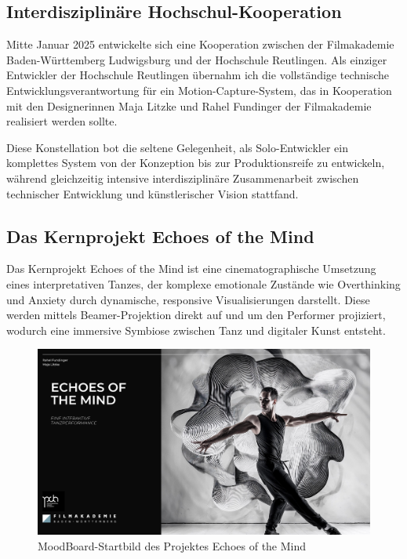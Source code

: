 
\subsection{Interdisziplinäre Hochschul-Kooperation}

Mitte Januar 2025 entwickelte sich eine Kooperation zwischen der Filmakademie Baden-Württemberg Ludwigsburg und der Hochschule Reutlingen. Als einziger Entwickler der Hochschule Reutlingen übernahm ich die vollständige technische Entwicklungsverantwortung für ein Motion-Capture-System, das in Kooperation mit den Designerinnen Maja Litzke und Rahel Fundinger der Filmakademie realisiert werden sollte.

Diese Konstellation bot die seltene Gelegenheit, als Solo-Entwickler ein komplettes System von der Konzeption bis zur Produktionsreife zu entwickeln, während gleichzeitig intensive interdisziplinäre Zusammenarbeit zwischen technischer Entwicklung und künstlerischer Vision stattfand.

\subsection{Das Kernprojekt Echoes of the Mind}

Das Kernprojekt Echoes of the Mind ist eine cinematographische Umsetzung eines interpretativen Tanzes, der komplexe emotionale Zustände wie Overthinking und Anxiety durch dynamische, responsive Visualisierungen darstellt. Diese werden mittels Beamer-Projektion direkt auf und um den Performer projiziert, wodurch eine immersive Symbiose zwischen Tanz und digitaler Kunst entsteht.

\begin{figure}[h]
    \centering
    \includegraphics[width=\textwidth]{images/EchoesOfTheMind_startbild.png}
    \caption{MoodBoard-Startbild des Projektes \glqq Echoes of the Mind\grqq{}}
    \label{fig:echoes_startbild}
\end{figure}

